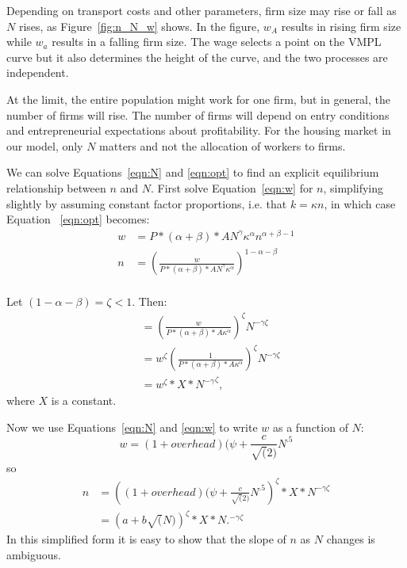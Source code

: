 {\color{red} Depending on transport costs and other parameters, firm size may rise or fall as $N$ rises, as Figure~\ref{fig:n_N_w} shows. In the figure, $w_A$ results in rising firm size while $w_a$ results in a falling firm size. The wage selects a point on the VMPL curve but it also determines the  height of the curve, and the two processes are independent.}

At the limit, the entire population might work for one firm, but in general, the number of firms will rise. The number of firms will depend on entry conditions and entrepreneurial expectations about profitability. For the housing market in our model, only $N$ matters and not the allocation of workers to firms.%

We can solve Equations~\ref{eqn:N} and \ref{eqn:opt} to find an explicit equilibrium relationship between $n$ and $N$. First solve Equation~\ref{eqn:w} for $n$, simplifying slightly by assuming constant factor proportions, i.e. that  $k=\kappa n$, in which case Equation~ \ref{eqn:opt} becomes: 
\begin{align}\label{eqn:opt1}
w   &= P*(\alpha+\beta)*AN^\gamma \kappa^\alpha n^{\alpha+\beta-1} \\   
n  &=\left(\frac{w}{P*(\alpha+\beta)*AN^\gamma \kappa^\alpha}\right)^{1-\alpha-\beta} \\
\end{align}

Let $(1-\alpha-\beta) = \zeta <1.$ Then:
\begin{align}
    &=\left(\frac{w}{P*(\alpha+\beta)*A \kappa^\alpha}\right)^\zeta N^{-\gamma\zeta }\\
    &=w^\zeta\left(\frac{1}{P*(\alpha+\beta)*A \kappa^\alpha}\right)^\zeta N^{-\gamma\zeta }\\
    &=w^\zeta*X*{N^{-\gamma}}^\zeta,
\end{align}
where $X$ is a constant.

Now we use Equations~\ref{eqn:N} and \ref{eqn:w} to write $w$ as a function of $N$:
\[w=(1+overhead)(\psi+\frac{c}{\sqrt(2)}N^{.5}\]
so
\begin{align}
    n &= \left((1+overhead)(\psi+\frac{c}{\sqrt(2)}N^{.5}\right)^\zeta*X*N^{-\gamma\zeta }\\
  &= \left(a+b\sqrt(N)\right)^\zeta*X*N.^{-\gamma\zeta }   
\end{align}
In this simplified form it is easy to show that the slope of $n$ as $N$ changes is ambiguous. %

